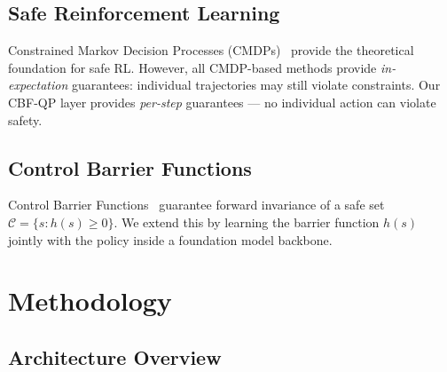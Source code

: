 \documentclass[conference]{IEEEtran}
\begin{document}
\subsection{Safe Reinforcement Learning}
Constrained Markov Decision Processes (CMDPs)~\cite{altman1999cmdp} provide the theoretical foundation for safe RL.
However, all CMDP-based methods provide \emph{in-expectation} guarantees: individual trajectories may still violate constraints.
Our CBF-QP layer provides \emph{per-step} guarantees --- no individual action can violate safety.

\subsection{Control Barrier Functions}
Control Barrier Functions~\cite{ames2017cbf} guarantee forward invariance of a safe set $\mathcal{C} = \{s : h(s) \geq 0\}$. We extend this by learning the barrier function $h(s)$ jointly with the policy inside a foundation model backbone.

\section{Methodology}
\subsection{Architecture Overview}
\end{document}

